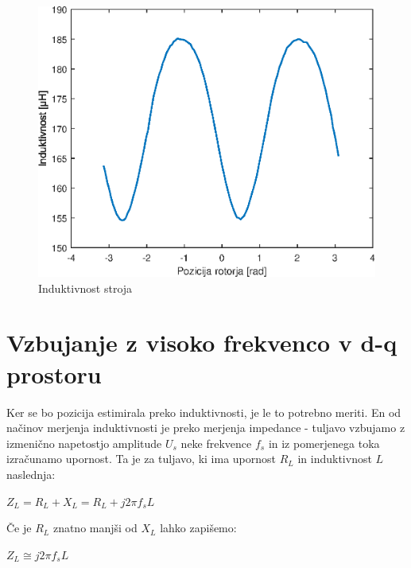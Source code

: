 \documentclass[a4paper,twoside,openright,12pt,slovene]{book}
\begin{document}
\begin{figure}[!htbp]
    \centering
    \includegraphics[width=1\columnwidth]{Slike/induktivnostStroja.eps}
    \caption{\label{induktivnostStroja} Induktivnost stroja}
\end{figure}


\section{Vzbujanje z visoko frekvenco v d-q prostoru}
Ker se bo pozicija estimirala preko induktivnosti, je le to potrebno meriti. En od načinov merjenja induktivnosti je preko merjenja impedance - tuljavo vzbujamo z izmenično napetostjo amplitude $U_s$
neke frekvence $f_s$ in iz pomerjenega toka izračunamo upornost. Ta je za tuljavo, ki ima upornost $R_L$ in induktivnost $L$ naslednja:

\begin{center}
    $Z_L = R_L + X_L = R_L + j2\pi f_sL$
\end{center}

Če je $R_L$ znatno manjši od $X_L$ lahko zapišemo:

\begin{center}
    $Z_L \cong j2\pi f_sL$
\end{center}
\end{document}
